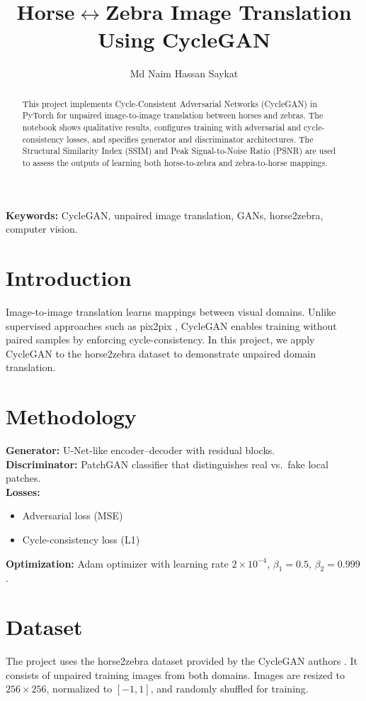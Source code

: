 \documentclass[11pt,a4paper]{article}
\title{\textbf{Horse$\leftrightarrow$Zebra Image Translation Using CycleGAN}}
\author{Md Naim Hassan Saykat}
\date{}
\begin{document}
\maketitle

\begin{abstract}
This project implements Cycle-Consistent Adversarial Networks (CycleGAN) in PyTorch for unpaired image-to-image translation between horses and zebras. The notebook shows qualitative results, configures training with adversarial and cycle-consistency losses, and specifies generator and discriminator architectures. The Structural Similarity Index (SSIM) and Peak Signal-to-Noise Ratio (PSNR) are used to assess the outputs of learning both horse-to-zebra and zebra-to-horse mappings.
\end{abstract}

\noindent \textbf{Keywords:} CycleGAN, unpaired image translation, GANs, horse2zebra, computer vision.

\section{Introduction}
Image-to-image translation learns mappings between visual domains. Unlike supervised approaches such as pix2pix \cite{Isola2017Pix2Pix}, CycleGAN \cite{Zhu2017CycleGAN} enables training without paired samples by enforcing cycle-consistency. In this project, we apply CycleGAN to the horse2zebra dataset to demonstrate unpaired domain translation.

\section{Methodology}
\textbf{Generator:} U-Net-like encoder--decoder with residual blocks. \\
\textbf{Discriminator:} PatchGAN classifier that distinguishes real vs.\ fake local patches. \\
\textbf{Losses:}
\begin{itemize}[leftmargin=1.25em]
    \item Adversarial loss (MSE)
    \item Cycle-consistency loss (L1)
\end{itemize}
\textbf{Optimization:} Adam optimizer with learning rate $2 \times 10^{-4}$, $\beta_1=0.5$, $\beta_2=0.999$.

\section{Dataset}
The project uses the horse2zebra dataset provided by the CycleGAN authors \cite{Zhu2017CycleGAN}. It consists of unpaired training images from both domains. Images are resized to $256 \times 256$, normalized to $[-1, 1]$, and randomly shuffled for training.
\end{document}
